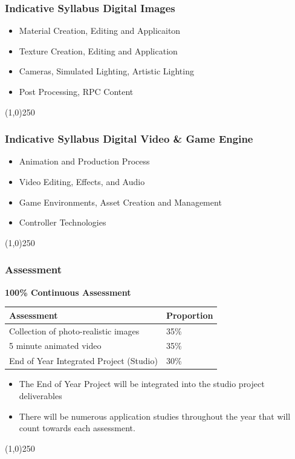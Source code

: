 \begin{frame}
\frametitle{Indicative Syllabus \hfill\hfill Digital Images}

\begin{itemize}
	\item Material Creation, Editing and Applicaiton
	\item Texture Creation, Editing and Application
	\item Cameras, Simulated Lighting, Artistic Lighting
	\item Post Processing, RPC Content
\end{itemize}
\end{frame}
\begin{center}\line(1,0){250}\end{center}


\begin{frame}
\frametitle{Indicative Syllabus \hfill\hfill Digital Video \& Game Engine}

\begin{itemize}
	\item Animation and Production Process
	\item Video Editing, Effects, and Audio
	\item Game Environments, Asset Creation and Management
	\item Controller Technologies
\end{itemize}
\end{frame}
\begin{center}\line(1,0){250}\end{center}






\begin{frame}
\frametitle{Assessment}
\textbf{100\% Continuous Assessment}
\begin{table}[htp]
	\centering
		\begin{tabular}{|l|l|}
			\hline
			\textbf{Assessment} & \textbf{Proportion} \\
			\hline
			Collection of photo-realistic images &		35\% \\
			5 minute animated video 						&   	35\% 			\\
			End of Year Integrated Project (Studio)  & 30\% 		\\
			\hline
		\end{tabular}
		\label{tab:Assessments}
\end{table}
\begin{itemize}
	\item The End of Year Project will be integrated into the studio project deliverables\\
	\item There will be numerous application studies throughout the year that will count towards each assessment.
\end{itemize}
\end{frame}
\begin{center}\line(1,0){250}\end{center}





